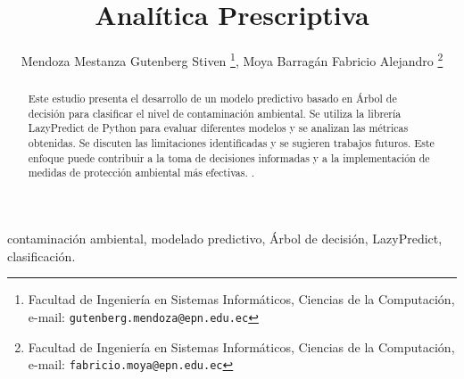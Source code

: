\documentclass[twocolumn,twoside]{Jornadas}
\begin{document}
\title{Analítica Prescriptiva}

\author{%
     Mendoza Mestanza Gutenberg Stiven%
     \thanks{Facultad de Ingeniería en Sistemas Informáticos, Ciencias de la Computación, e-mail: {\tt gutenberg.mendoza@epn.edu.ec}},
     Moya Barragán Fabricio Alejandro%
     \thanks{Facultad de Ingeniería en Sistemas Informáticos, Ciencias de la Computación, 
     e-mail: {\tt fabricio.moya@epn.edu.ec}}
}

\maketitle
\markboth{}{}
\pagestyle{empty} 
\thispagestyle{empty} %

\begin{abstract}
Este estudio presenta el desarrollo de un modelo predictivo basado en Árbol de decisión para clasificar el nivel de contaminación ambiental. Se utiliza la librería LazyPredict de Python para evaluar diferentes modelos y se analizan las métricas obtenidas. Se discuten las limitaciones identificadas y se sugieren trabajos futuros. Este enfoque puede contribuir a la toma de decisiones informadas y a la implementación de medidas de protección ambiental más efectivas.
.
\end{abstract}

\begin{keywords}
contaminación ambiental, modelado predictivo, Árbol de decisión, LazyPredict, clasificación.
\end{keywords}

















\end{document}
